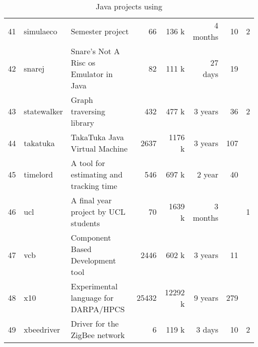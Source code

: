\begin{table*}[htb]
\begin{tabularx}{\textwidth}{|r|l|X|r|r|r|r|r|}
  41 & simulaeco & Semester project  &  66 & 136 k &  4 months  &  10 & 2 \\ 
  42 & snarej & Snare's Not A Risc os Emulator in Java  &  82 & 111 k &  27 days &  19 & \\ 
  43 & statewalker & Graph traversing library   & 432 & 477 k & 3 years &  36 & 2 \\ 
  44 & takatuka & TakaTuka Java Virtual Machine   & 2637 & 1176 k & 3 years & 107 & \\ 
  45 & timelord & A tool for estimating and tracking time   & 546 & 697 k &  2 year &  40 & \\ 
  46 & ucl & A final year project by UCL students &  70 & 1639 k &  3 months & & 1 \\ 
  47 & vcb & Component Based Development tool   & 2446 & 602 k & 3 years &  11 & \\ 
  48 & x10 & Experimental language for DARPA/HPCS   & 25432 & 12292 k & 9 years & 279 & \\ 
  49 & xbeedriver & Driver for the ZigBee network  &   6 & 119 k &  3 days &  10 & 2\\ 
  \hline
\end{tabularx}
\caption{Java projects using \smu{}}  \label{table:projects}
\end{table*}
